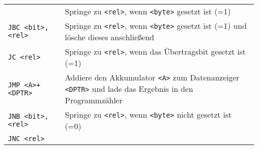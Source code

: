 \begin{longtable}[c]{@{}ll@{}}
\begin{minipage}[t]{0.25\columnwidth}
\strut\end{minipage} &
\begin{minipage}[t]{0.69\columnwidth}\raggedright\strut
Springe zu \texttt{\textless{}rel\textgreater{}}, wenn
\texttt{\textless{}byte\textgreater{}} gesetzt ist (=1)
\strut\end{minipage}\tabularnewline
\begin{minipage}[t]{0.25\columnwidth}\raggedright\strut
\texttt{JBC\ \textless{}bit\textgreater{},\textless{}rel\textgreater{}}
\strut\end{minipage} &
\begin{minipage}[t]{0.69\columnwidth}\raggedright\strut
Springe zu \texttt{\textless{}rel\textgreater{}}, wenn
\texttt{\textless{}byte\textgreater{}} gesetzt ist (=1) und lösche
dieses anschließend
\strut\end{minipage}\tabularnewline
\begin{minipage}[t]{0.25\columnwidth}\raggedright\strut
\texttt{JC\ \textless{}rel\textgreater{}}
\strut\end{minipage} &
\begin{minipage}[t]{0.69\columnwidth}\raggedright\strut
Springe zu \texttt{\textless{}rel\textgreater{}}, wenn das Übertragsbit
gesetzt ist (=1)
\strut\end{minipage}\tabularnewline
\begin{minipage}[t]{0.25\columnwidth}\raggedright\strut
\texttt{JMP\ \textless{}A\textgreater{}+\textless{}DPTR\textgreater{}}
\strut\end{minipage} &
\begin{minipage}[t]{0.69\columnwidth}\raggedright\strut
Addiere den Akkumulator \texttt{\textless{}A\textgreater{}} zum
Datenanzeiger \texttt{\textless{}DPTR\textgreater{}} und lade das
Ergebnis in den Programmzähler
\strut\end{minipage}\tabularnewline
\begin{minipage}[t]{0.25\columnwidth}\raggedright\strut
\texttt{JNB\ \textless{}bit\textgreater{},\textless{}rel\textgreater{}}
\strut\end{minipage} &
\begin{minipage}[t]{0.69\columnwidth}\raggedright\strut
Springe zu \texttt{\textless{}rel\textgreater{}}, wenn
\texttt{\textless{}byte\textgreater{}} nicht gesetzt ist (=0)
\strut\end{minipage}\tabularnewline
\begin{minipage}[t]{0.25\columnwidth}\raggedright\strut
\texttt{JNC\ \textless{}rel\textgreater{}}
\strut\end{minipage} &

\end{longtable}
